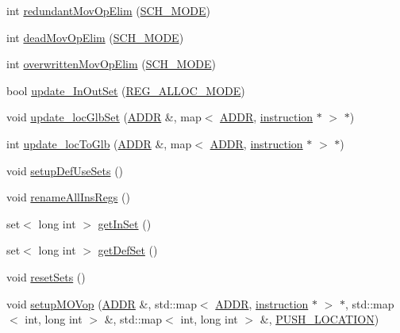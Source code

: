 \begin{DoxyCompactItemize}
\item 
int \hyperlink{classbasicblock_ae97e01492662bce4919253c165c674bd}{redundantMovOpElim} (\hyperlink{binaryTranslator_2global_8h_a81dba944bc61f5b25a3513766ef6651b}{SCH\_\-MODE})
\item 
int \hyperlink{classbasicblock_ad5edb15079fcd7c2dd0e7e78185d9826}{deadMovOpElim} (\hyperlink{binaryTranslator_2global_8h_a81dba944bc61f5b25a3513766ef6651b}{SCH\_\-MODE})
\item 
int \hyperlink{classbasicblock_a91953b5e5abf82c6623ca043b2424336}{overwrittenMovOpElim} (\hyperlink{binaryTranslator_2global_8h_a81dba944bc61f5b25a3513766ef6651b}{SCH\_\-MODE})
\item 
bool \hyperlink{classbasicblock_a0dbb44100534178477e2a33ee1c34134}{update\_\-InOutSet} (\hyperlink{binaryTranslator_2global_8h_a78dd04e0a4364ff551d83095f9bc0264}{REG\_\-ALLOC\_\-MODE})
\item 
void \hyperlink{classbasicblock_a04346052feca6f21451ab71050afe893}{update\_\-locGlbSet} (\hyperlink{binaryTranslator_2global_8h_a8bb6b77b3aab51e3a8d1866dd5861225}{ADDR} \&, map$<$ \hyperlink{binaryTranslator_2global_8h_a8bb6b77b3aab51e3a8d1866dd5861225}{ADDR}, \hyperlink{classinstruction}{instruction} $\ast$ $>$ $\ast$)
\item 
int \hyperlink{classbasicblock_ad96c83ff578c7c8c9a2bcd74a2c26add}{update\_\-locToGlb} (\hyperlink{binaryTranslator_2global_8h_a8bb6b77b3aab51e3a8d1866dd5861225}{ADDR} \&, map$<$ \hyperlink{binaryTranslator_2global_8h_a8bb6b77b3aab51e3a8d1866dd5861225}{ADDR}, \hyperlink{classinstruction}{instruction} $\ast$ $>$ $\ast$)
\item 
void \hyperlink{classbasicblock_a828499c93c05d54ff789feed38051428}{setupDefUseSets} ()
\item 
void \hyperlink{classbasicblock_a8493801bbd0b56aac41aa8cd2aedcea4}{renameAllInsRegs} ()
\item 
set$<$ long int $>$ \hyperlink{classbasicblock_a449cfdd7832d738451da0d773f45a120}{getInSet} ()
\item 
set$<$ long int $>$ \hyperlink{classbasicblock_a208aa13365196998e48936c287242a77}{getDefSet} ()
\item 
void \hyperlink{classbasicblock_a9d7e049bd37a23efb5e9ea1d230dc2bc}{resetSets} ()
\item 
void \hyperlink{classbasicblock_ad33cd8a566195b2f3118abafbeffaf82}{setupMOVop} (\hyperlink{binaryTranslator_2global_8h_a8bb6b77b3aab51e3a8d1866dd5861225}{ADDR} \&, std::map$<$ \hyperlink{binaryTranslator_2global_8h_a8bb6b77b3aab51e3a8d1866dd5861225}{ADDR}, \hyperlink{classinstruction}{instruction} $\ast$ $>$ $\ast$, std::map$<$ int, long int $>$ \&, std::map$<$ int, long int $>$ \&, \hyperlink{binaryTranslator_2global_8h_ae3190c0c46d1384e80f94a61ad275092}{PUSH\_\-LOCATION})

\end{DoxyCompactItemize}
